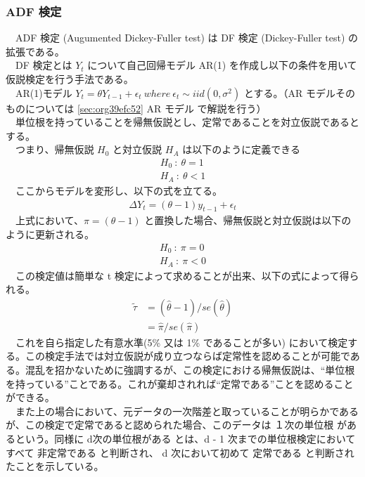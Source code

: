 \documentclass{scrartcl}
\begin{document}
\newpage
\subsubsection{ADF 検定}
\label{sec:org10dd2f8}
　ADF 検定 (Augumented Dickey-Fuller test) は DF 検定 (Dickey-Fuller test) の拡張である。\\
　DF 検定とは \(Y_t\) について自己回帰モデル AR(1) を作成し以下の条件を用いて仮説検定を行う手法である。\\
　AR(1)モデル \(Y_t = \theta Y_{t-1} + \epsilon_t \  where \ \epsilon_t \sim iid(0, \sigma^2)\) とする。（AR モデルそのものについては \ref{sec:org39efc52} AR モデル で解説を行う）\\
　単位根を持っていることを帰無仮説とし、定常であることを対立仮説であるとする。\\
　つまり、帰無仮説 \(H_0\) と対立仮説 \(H_A\) は以下のように定義できる\\
\begin{align}
H_0\ :\ \theta = 1 \\
H_A\ :\ \theta < 1
\end{align}
　ここからモデルを変形し、以下の式を立てる。\\
\begin{align}
\Delta Y_t = (\theta - 1) y_{t-1} + \epsilon_t   
\end{align}
　上式において、\(\pi = (\theta - 1)\) と置換した場合、帰無仮説と対立仮説は以下のように更新される。\\
\begin{align}
H_0\ :\ \pi = 0 \\
H_A\ :\ \pi < 0
\end{align}
　この検定値は簡単な t 検定によって求めることが出来、以下の式によって得られる。\\
    \begin{align}
\widetilde{\tau} &= (\hat{\theta} - 1) / {se(\hat{\theta})} \nonumber \\ 
                 &= \hat{\pi} / se(\hat{\pi})
    \end{align}
　これを自ら指定した有意水準(5\% 又は 1\% であることが多い) において検定する。この検定手法では対立仮説が成り立つならば定常性を認めることが可能である。混乱を招かないために強調するが、この検定における帰無仮説は、``単位根を持っている''ことである。これが棄却されれば``定常である''ことを認めることができる。\\
　また上の場合において、元データの一次階差と取っていることが明らかであるが、この検定で定常であると認められた場合、このデータは １次の単位根 があるという。同様に d次の単位根がある とは、d - 1 次までの単位根検定においてすべて 非定常である と判断され、 d 次において初めて 定常である と判断されたことを示している。\\
\end{document}
